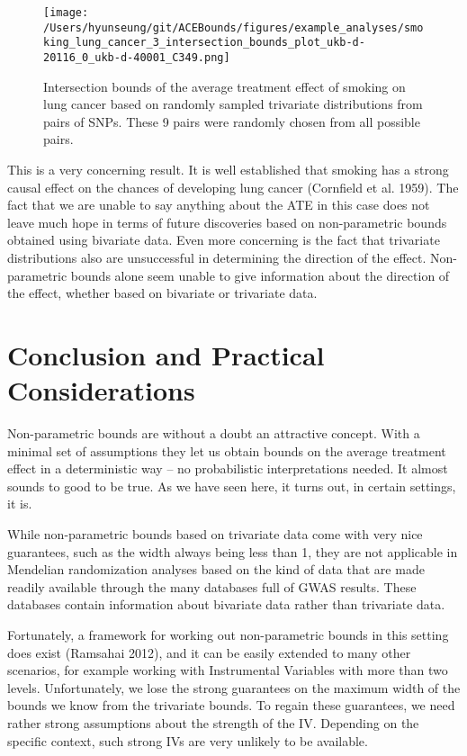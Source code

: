 \documentclass[
]{article}
\theoremstyle{plain}
\begin{document}
{\clearpage

\begin{figure}[H]
  \texttt{[image: /Users/hyunseung/git/ACEBounds/figures/example\_analyses/smoking\_lung\_cancer\_3\_intersection\_bounds\_plot\_ukb-d-20116\_0\_ukb-d-40001\_C349.png]}
  \caption{Intersection bounds of the average treatment effect of smoking on lung cancer based on randomly sampled trivariate distributions from pairs of SNPs. These 9 pairs were randomly chosen from all possible pairs.}
  \label{fig:smoking_on_lung_cancer_intersections}
\end{figure}

This is a very concerning result. It is well established that smoking has a strong causal effect on the chances of developing lung cancer (Cornfield et al. 1959). The fact that we are unable to say anything about the ATE in this case does not leave much hope in terms of future discoveries based on non-parametric bounds obtained using bivariate data. Even more concerning is the fact that trivariate distributions also are unsuccessful in determining the direction of the effect. Non-parametric bounds alone seem unable to give information about the direction of the effect, whether based on bivariate or trivariate data.

\newpage

\hypertarget{conclusion-and-practical-considerations}{%
\section{Conclusion and Practical Considerations}\label{conclusion-and-practical-considerations}}

Non-parametric bounds are without a doubt an attractive concept. With a minimal set of assumptions they let us obtain bounds on the average treatment effect in a deterministic way -- no probabilistic interpretations needed. It almost sounds to good to be true. As we have seen here, it turns out, in certain settings, it is.

While non-parametric bounds based on trivariate data come with very nice guarantees, such as the width always being less than 1, they are not applicable in Mendelian randomization analyses based on the kind of data that are made readily available through the many databases full of GWAS results. These databases contain information about bivariate data rather than trivariate data.

Fortunately, a framework for working out non-parametric bounds in this setting does exist (Ramsahai 2012), and it can be easily extended to many other scenarios, for example working with Instrumental Variables with more than two levels. Unfortunately, we lose the strong guarantees on the maximum width of the bounds we know from the trivariate bounds. To regain these guarantees, we need rather strong assumptions about the strength of the IV. Depending on the specific context, such strong IVs are very unlikely to be available.

}
\end{document}
